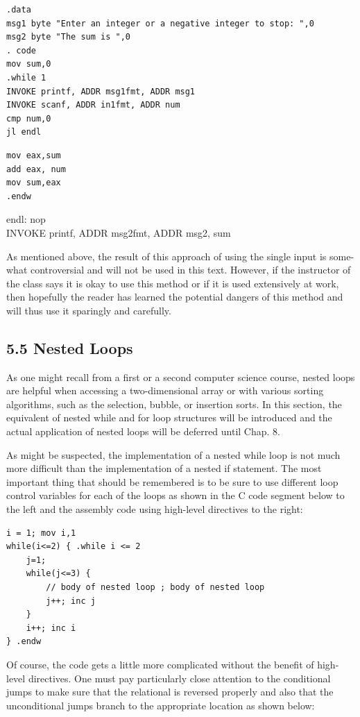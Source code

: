 \documentclass[10pt]{book}
\begin{document}
\begin{verbatim}
.data
msg1 byte "Enter an integer or a negative integer to stop: ",0
msg2 byte "The sum is ",0
. code
mov sum,0
.while 1
INVOKE printf, ADDR msg1fmt, ADDR msg1
INVOKE scanf, ADDR in1fmt, ADDR num
cmp num,0
jl endl
\end{verbatim}

\begin{verbatim}
mov eax,sum
add eax, num
mov sum,eax
.endw
\end{verbatim}

endl: nop\\
INVOKE printf, ADDR msg2fmt, ADDR msg2, sum

As mentioned above, the result of this approach of using the single input is some-what controversial and will not be used in this text. However, if the instructor of the class says it is okay to use this method or if it is used extensively at work, then hopefully the reader has learned the potential dangers of this method and will thus use it sparingly and carefully.

\subsection*{5.5 Nested Loops}
As one might recall from a first or a second computer science course, nested loops are helpful when accessing a two-dimensional array or with various sorting algorithms, such as the selection, bubble, or insertion sorts. In this section, the equivalent of nested while and for loop structures will be introduced and the actual application of nested loops will be deferred until Chap. 8.

As might be suspected, the implementation of a nested while loop is not much more difficult than the implementation of a nested if statement. The most important thing that should be remembered is to be sure to use different loop control variables for each of the loops as shown in the C code segment below to the left and the assembly code using high-level directives to the right:

\begin{verbatim}
i = 1; mov i,1
while(i<=2) { .while i <= 2
    j=1;
    while(j<=3) {
        // body of nested loop ; body of nested loop
        j++; inc j
    }
    i++; inc i
} .endw
\end{verbatim}

Of course, the code gets a little more complicated without the benefit of high-level directives. One must pay particularly close attention to the conditional jumps to make sure that the relational is reversed properly and also that the unconditional jumps branch to the appropriate location as shown below:
\end{document}
